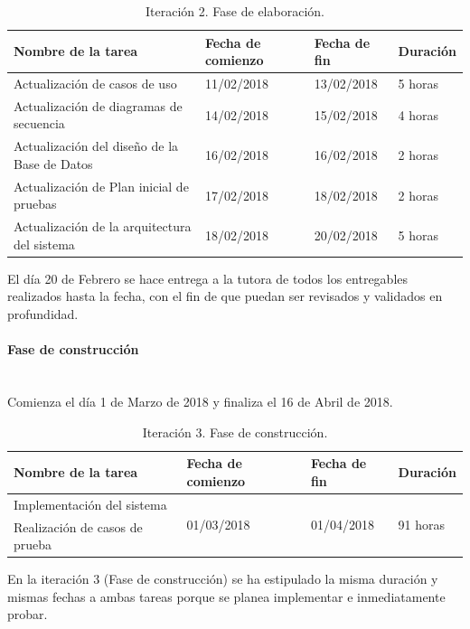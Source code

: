 \documentclass[twoside]{report}
\begin{document}
\begin{table}[H]
\centering
\begin{tabular}{|l|l|l|l|}
\hline
Nombre de la tarea                           & Fecha de comienzo & Fecha de fin & Duración \\ \hline
Actualización de casos de uso                & 11/02/2018        & 13/02/2018   & 5 horas   \\ \hline
Actualización de diagramas de secuencia      & 14/02/2018        & 15/02/2018   & 4 horas   \\ \hline
Actualización del diseño de la Base de Datos & 16/02/2018        & 16/02/2018   & 2 horas   \\ \hline
Actualización de Plan inicial de pruebas     & 17/02/2018        & 18/02/2018   & 2 horas   \\ \hline
Actualización de la arquitectura del sistema & 18/02/2018        & 20/02/2018   & 5 horas   \\ \hline
\end{tabular}
\caption{Iteración 2. Fase de elaboración.}
\end{table}

El día 20 de Febrero se hace entrega a la tutora de todos los entregables realizados hasta la fecha, con el fin de que puedan ser revisados y validados en profundidad.


\paragraph{Fase de construcción}\mbox{}\\

Comienza el día 1 de Marzo de 2018 y finaliza el 16 de Abril de 2018.

\begin{table}[H]
\centering
\begin{tabular}{|l|l|l|l|}
\hline
Nombre de la tarea             & Fecha de comienzo & Fecha de fin & Duración \\ \hline
Implementación del sistema & \multirow{2}{*}{01/03/2018}  & \multirow{2}{*}{01/04/2018}   & \multirow{2}{*}{91 horas}  \\
Realización de casos de prueba & & & \\
\hline
\end{tabular}
\caption{Iteración 3. Fase de construcción.}
\end{table}

En la iteración 3 (Fase de construcción) se ha estipulado la misma duración y mismas fechas a ambas tareas porque se planea implementar e inmediatamente probar.
\end{document}
